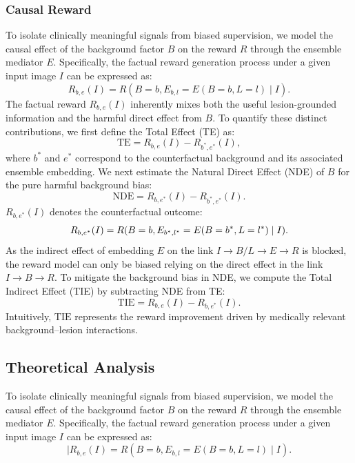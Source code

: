 \subsubsection{Causal Reward}

To isolate clinically meaningful signals from biased supervision, 
we model the causal effect of the background factor $B$ on the reward $R$ through the ensemble mediator $E$. 
Specifically, the factual reward generation process under a given input image $I$ can be expressed as:
\begin{equation}
R_{b,e}(I) = R(B=b, E_{b,l}=E(B=b,L=l) \mid I).
\end{equation}
The factual reward $R_{b,e}(I)$ inherently mixes both the useful lesion-grounded information and the harmful direct effect from $B$. 
To quantify these distinct contributions, we first define the Total Effect (TE) as:
\begin{equation}
\mathrm{TE} = R_{b,e}(I) - R_{b^{*},e^{*}}(I),
\end{equation}
where $b^{*}$ and $e^{*}$ correspond to the counterfactual background and its associated ensemble embedding. We next estimate the Natural Direct Effect (NDE) of $B$ for the pure harmful background bias:
\begin{equation}
\mathrm{NDE} = R_{b,e^{*}}(I) - R_{b^{*},e^{*}}(I).
\end{equation}
$R_{b,e^{*}}(I)$ denotes the counterfactual outcome: 
\begin{equation}
\small
R_{b,e^{*}}(I) = R(B=b, E_{b^{*},l^{*}}=E(B=b^{*},L=l^{*}) \mid I).
\end{equation}
As the indirect effect of embedding $E$ on the link $I \rightarrow B/L \rightarrow E \rightarrow R$ is blocked, the reward model can only be biased relying on the direct effect in the link $I \rightarrow B \rightarrow R$. To mitigate the background bias in NDE, we compute the Total Indirect Effect (TIE) by subtracting NDE from TE:
\begin{equation}
\mathrm{TIE} = R_{b,e}(I) - R_{b,e^{*}}(I).
\label{eq:tie}
\end{equation}
Intuitively, $\mathrm{TIE}$ represents the reward improvement driven by medically relevant background–lesion interactions.

\subsection{Theoretical Analysis}
\label{sec:theory}

To isolate clinically meaningful signals from biased supervision, we model the causal effect of the background factor $B$ on the reward $R$ through the ensemble mediator $E$.
Specifically, the factual reward generation process under a given input image $I$ can be expressed as:
\begin{equation}
|R_{b,e}(I) = R(B=b, E_{b,l}=E(B=b,L=l) \mid I).
\end{equation}

